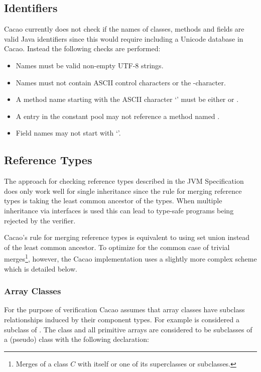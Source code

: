 \subsection{Identifiers}

Cacao currently does not check if the names of classes, methods and
fields are valid Java identifiers since this would require including a
Unicode database in Cacao. Instead the following checks are performed:

\begin{itemize}
\item Names must be valid non-empty UTF-8 strings.
\item Names must not contain ASCII control characters or the
      -character.
\item A method name starting with the ASCII character `\code{<}' must be
      either  or .
\item A  entry in the constant pool may not
      reference a method named .
\item Field names may not start with `\code{<}'.

\end{itemize}

\subsection{Reference Types}

The approach for checking reference types described in the JVM
Specification \cite{javavm99} does only work well for single
inheritance since the rule for merging reference types is taking the
least common ancestor of the types. When multiple inheritance via
interfaces is used this can lead to type-safe programs being rejected
by the verifier.

Cacao's rule for merging reference types is equivalent to using set
union instead of the least common ancestor. To optimize for the common
case of trivial merges\footnote{Merges of a class $C$ with itself or
one of its superclasses or subclasses.}, however, the Cacao
implementation uses a slightly more complex scheme which is detailed
below.

\subsubsection{Array Classes}

For the purpose of verification Cacao assumes that array classes have
subclass relationships induced by their component types. For example
 is considered a subclass of . The
class  and all primitive arrays are considered to be
subclasses of a (pseudo) class  with the following
declaration:

